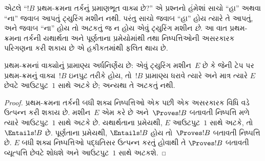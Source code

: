 \begin{explain}
એટલે ``$!B$ પ્રથમ-ક્રમના તર્કનું પ્રમાણભૂત વાક્ય
છે?'' એ પ્રશ્નનો હંમેશાં સાચો ``હા'' અથવા ``ના''
જવાબ આપતું ટ્યુરિંગ મશીન નથી. પરંતુ સાચો જવાબ
``હા'' હોય ત્યારે તે આપતું, અને જવાબ ``ના'' હોય તો
અટકતું જ ન હોય એવું ટ્યુરિંગ મશીન \emph{છે}.
આ વાત પ્રથમ-ક્રમના તર્કની યથાર્થતા અને પૂર્ણતાના
પ્રમેયોમાંથી તથા નિષ્પત્તિઓની અસરકારક પરિગણના
કરી શકાય છે એ હકીકતમાંથી ફલિત થાય છે.
\end{explain}

\begin{thm}
  પ્રથમ-ક્રમનાં વાક્યોનું પ્રામાણ્ય અર્ધનિર્ણેય
  છે: એવું ટ્યુરિંગ મશીન~$E$ છે કે જેની ટેપ પર
  પ્રથમ-ક્રમનું વાક્ય~$!B$ ઇનપુટ તરીકે હોય,
  તો~$!B$ પ્રામાણ્ય ધરાવે ત્યારે અને માત્ર ત્યારે
  $E$ છેવટે આઉટપુટ~$1$ સાથે અટકે છે; અન્યથા તે
  અટકતું નથી.
\end{thm}

\begin{proof}
  પ્રથમ-ક્રમના તર્કની બધી શક્ય નિષ્પત્તિઓ એક
  પછી એક અસરકારક વિધિ વડે ઉત્પન્ન કરી શકાય છે.
  મશીન~$E$ એમ કરે છે અને~$\Proves !B$ બતાવતી
  નિષ્પત્તિ મળે ત્યારે આઉટપુટ~$1$ સાથે અટકે છે.
  યથાર્થતાના પ્રમેયથી, $E$ આઉટપુટ~$1$ સાથે અટકે,
  તો~$\Entails !B$ છે. પૂર્ણતાના પ્રમેયથી,
  $\Entails !B$ હોય તો~$\Proves !B$ બતાવતી
  નિષ્પત્તિ છે. $E$ બધી શક્ય નિષ્પત્તિઓ
  પદ્ધતિસર ઉત્પન્ન કરતું હોવાથી તે
  $\Proves !B$ બતાવતી વ્યૂત્પત્તિ છેવટે
  શોધશે અને આઉટપુટ~$1$
  સાથે અટકશે.
\end{proof}
\endgroup


\begingroup
\makeatletter{}\makeatother

\label{guunit:OLP-0273}


